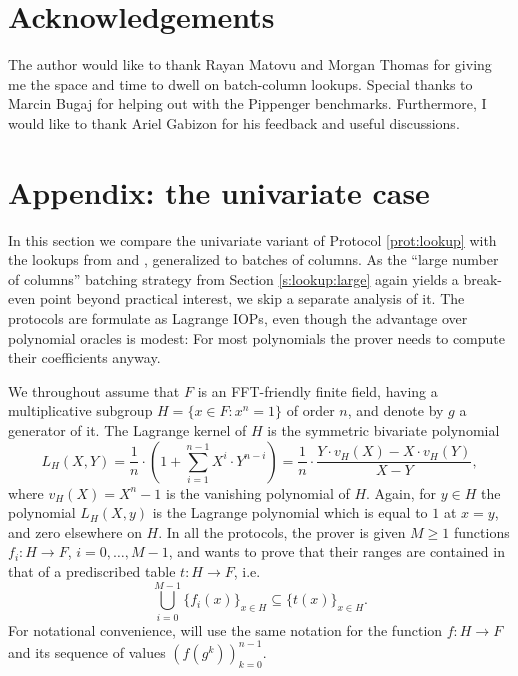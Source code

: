 \documentclass[11pt]{article}
\theoremstyle{definition}
\theoremstyle{remark}
\begin{document}
\section{Acknowledgements}

The author would like to thank Rayan Matovu and Morgan Thomas for giving me the space and time to dwell on batch-column lookups. 
Special thanks to Marcin Bugaj for helping out with the Pippenger benchmarks.
Furthermore, I would like to thank Ariel Gabizon for his feedback and useful discussions.






\appendix
\section{Appendix: the univariate case}
\label{s:appendix}

In this section we compare the univariate variant of Protocol \ref{prot:lookup} with the lookups from \cite{Plookup} and \cite{flookup}, generalized to batches of columns.
As the ``large number of columns'' batching strategy from Section \ref{s:lookup:large}  again yields a break-even point beyond practical interest\footnotemark, we skip a separate analysis of it.
%
The protocols are formulate as Lagrange IOPs, even though the advantage over  polynomial oracles is modest:
For most polynomials the prover needs to compute their coefficients anyway.

We throughout assume that $F$ is an FFT-friendly finite field, having a multiplicative subgroup $H = \{x\in F: x^n = 1\}$ of order $n$, and denote by $g$ a generator of it.  
The Lagrange kernel of $H$ is the symmetric bivariate polynomial
\[
L_H(X, Y) =\frac{1}{n}\cdot\left(1 + \sum_{i=1}^{n-1} X^i\cdot Y^{n-i}\right) = \frac{1}{n}\cdot \frac{Y\cdot v_H(X) - X\cdot v_H(Y)}{X - Y},
\]
where $v_H(X)= X^n - 1$ is the vanishing polynomial of $H$.
Again, for $y\in H$ the polynomial $L_H(X, y)$ is the Lagrange polynomial which is equal to $1$ at  $x=y$, and zero elsewhere on $H$.
In all the protocols, the prover is given $M\geq 1$ functions $f_i:H\rightarrow F$, $i=0, \ldots, M-1$, and wants to prove that their ranges are contained in that of a prediscribed table $t: H\rightarrow F$, i.e. 
\[
\bigcup_{i=0}^{M-1} \{f_i(x)\}_{x\in H}\subseteq \{t(x)\}_{x\in H}.
\]
For notational convenience, will use the same notation for the function $f: H\rightarrow F$ and its sequence of values $(f(g^k))_{k=0}^{n-1}$. 
\end{document}
